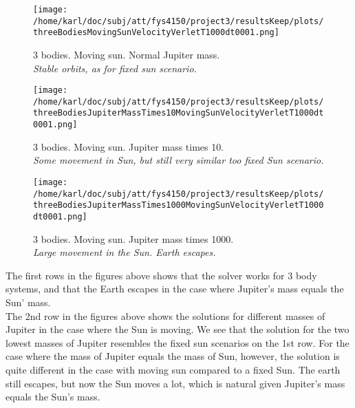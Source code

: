 \documentclass{article}
\begin{document}
\begin{minipage}{.3\textwidth} 
	\begin{figure}[H]
		\centering
		\texttt{[image: /home/karl/doc/subj/att/fys4150/project3/resultsKeep/plots/threeBodiesMovingSunVelocityVerletT1000dt0001.png]}
		\caption{3 bodies. Moving sun. Normal Jupiter mass. \\ \textit{Stable orbits, as for fixed sun scenario.}}
		\label{1}
	\end{figure}
\end{minipage}\hfill
\begin{minipage}{.3\textwidth} 
	\begin{figure}[H]
		\centering
		\texttt{[image: /home/karl/doc/subj/att/fys4150/project3/resultsKeep/plots/threeBodiesJupiterMassTimes10MovingSunVelocityVerletT1000dt0001.png]}
		\caption{3 bodies. Moving sun. Jupiter mass times 10. \\ \textit{Some movement in Sun, but still very similar too fixed Sun scenario.}}
		\label{1}
	\end{figure}
\end{minipage}\hfill
\begin{minipage}{.3\textwidth} 
	\begin{figure}[H]
		\centering
		\texttt{[image: /home/karl/doc/subj/att/fys4150/project3/resultsKeep/plots/threeBodiesJupiterMassTimes1000MovingSunVelocityVerletT1000dt0001.png]}
		\caption{3 bodies. Moving sun.  Jupiter mass times 1000. \\ \textit{Large movement in the Sun. Earth escapes.}}
		\label{1}
	\end{figure}
\end{minipage}\hfill
\vspace{2ex}



The first rows in the figures above shows that the solver works for 3 body systems, and that the Earth escapes in the case where Jupiter's mass equals the Sun' mass.\\

The 2nd row in the figures above shows the solutions for different masses of Jupiter in the case where the Sun is moving. We see that the solution for the two lowest masses of Jupiter resembles the fixed sun scenarios on the 1st row. For the case where the mass of Jupiter equals the mass of Sun, however, the solution is quite different in the case with moving sun compared to a fixed Sun. The earth still escapes, but now the Sun moves a lot, which is natural given Jupiter's mass equals the Sun's mass. \\
\end{document}

